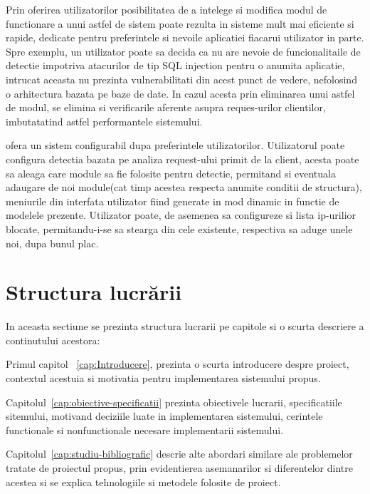 Prin oferirea utilizatorilor posibilitatea de a intelege si modifica modul de functionare a unui astfel de sistem poate rezulta in sisteme mult mai eficiente si rapide, dedicate pentru preferintele si nevoile aplicatiei fiacarui utilizator in parte. Spre exemplu, un utilizator poate sa decida ca nu are nevoie de funcionalitaile de detectie impotriva atacurilor de tip SQL injection pentru o anumita aplicatie, intrucat aceasta nu prezinta vulnerabilitati din acest punct de vedere, nefolosind o arhitectura bazata pe baze de date. In cazul acesta prin eliminarea unui astfel de modul, se elimina si verificarile aferente asupra reques-urilor clientilor, imbutatatind astfel performantele sistemului.

\textit{\thesistitle} ofera un sistem configurabil dupa preferintele utilizatorilor. Utilizatorul poate configura detectia bazata pe analiza request-ului primit de la client, acesta poate sa aleaga care module sa fie folosite pentru detectie, permitand si eventuala adaugare de noi module(cat timp acestea respecta anumite conditii de structura), meniurile din interfata utilizator fiind generate in mod dinamic in functie de modelele prezente. Utilizator poate, de asemenea sa configureze si lista ip-urilior blocate, permitandu-i-se sa stearga din cele existente, respectiva sa aduge unele noi, dupa bunul plac.



 \section{Structura lucrării}
In aceasta sectiune se prezinta structura lucrarii pe capitole si o scurta descriere a continutului acestora:

Primul capitol ~\ref{cap:Introducere}, prezinta o scurta introducere despre proiect, contextul acestuia si motivatia pentru implementarea sistemului propus.

Capitolul~\ref{cap:obiective-specificatii} prezinta obiectivele lucrarii, specificatiile sitemului, motivand deciziile luate in implementarea sistemului, cerintele functionale si nonfunctionale necesare implementarii sistemului.

Capitolul~\ref{cap:studiu-bibliografic} descrie alte abordari similare ale problemelor tratate de proiectul propus, prin evidentierea asemanarilor si diferentelor dintre acestea si se explica tehnologiile si metodele folosite de proiect.
 
